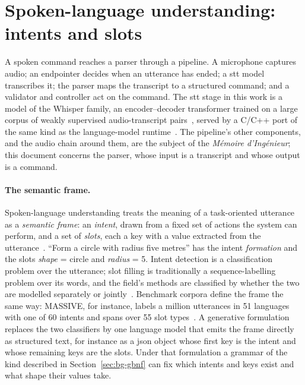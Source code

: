 \section{Spoken-language understanding: intents and slots}
\label{sec:bg-slu}

A spoken command reaches a parser through a pipeline. A microphone captures audio; an endpointer
decides when an utterance has ended; a \gls{stt} model transcribes it; the parser maps the
transcript to a structured command; and a validator and controller act on the command. The
\gls{stt} stage in this work is a model of the Whisper family, an encoder--decoder transformer
trained on a large corpus of weakly supervised audio-transcript pairs~\cite{whisper}, served by a
C/C++ port of the same kind as the language-model runtime~\cite{whispercpp}. The pipeline's other
components, and
the audio chain around them, are the subject of the \emph{M\'emoire d'Ing\'enieur}; this
document concerns the parser, whose input is a transcript and whose output is a command.

\paragraph{The semantic frame.} Spoken-language understanding treats the meaning of a
task-oriented utterance as a \emph{semantic frame}: an \emph{intent}, drawn from a fixed set of
actions the system can perform, and a set of \emph{slots}, each a key with a value extracted
from the utterance~\cite{qin2021}. ``Form a circle with radius five metres'' has the intent
\emph{formation} and the slots \emph{shape} = circle and \emph{radius} = 5. Intent detection is
a classification problem over the utterance; slot filling is traditionally a sequence-labelling
problem over its words, and the field's methods are classified by whether the two are modelled
separately or jointly~\cite{qin2021}. Benchmark corpora define the frame the same
way: MASSIVE, for instance, labels a million utterances in 51 languages with one of 60 intents and
spans over 55 slot types~\cite{massive}. A generative formulation replaces the two classifiers by
one language model that emits the frame directly as structured text, for instance as a
\gls{json} object whose first key is the intent and whose remaining keys are the slots. Under
that formulation a grammar of the kind described in Section~\ref{sec:bg-gbnf} can fix which
intents and keys exist and what shape their values take.


